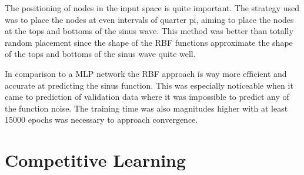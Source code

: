 \documentclass{article}
\begin{document}
The positioning of nodes in the input space is quite important. The strategy used was to place the nodes at even intervals of quarter pi, aiming to place the nodes at the tops and bottoms of the sinus wave. This method was better than totally random placement since the shape of the RBF functions approximate the shape of the tops and bottoms of the sinus wave quite well.

In comparison to a MLP network the RBF approach is way more efficient and accurate at predicting the sinus function. This was especially noticeable when it came to prediction of validation data where it was impossible to predict any of the function noise. The training time was also magnitudes higher with at least 15000 epochs was necessary to approach convergence.
\FloatBarrier
\section{Competitive Learning}
\end{document}
